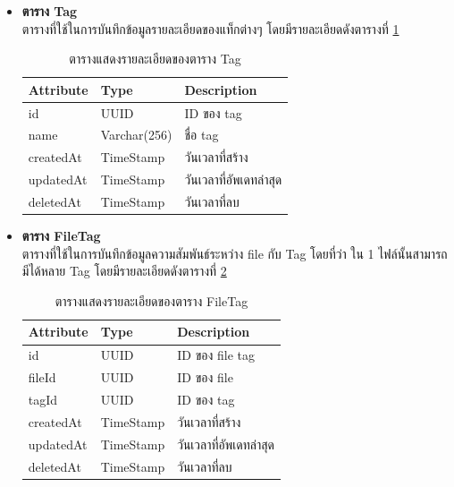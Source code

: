 \documentclass[12pt,oneside,openright,a4paper]{cpe-thai-project}
\begin{document}
\begin{itemize}
\item \textbf{ตาราง Tag}\\
ตารางที่ใช้ในการบันทึกข้อมูลรายละเอียดของแท็กต่างๆ โดยมีรายละเอียดดังตารางที่ \ref{tbl:dbTag}
\begin{table}[!ht]
    \centering
    \begin{tabular}{|p{4cm}|p{2cm}|p{6cm}|}
    \hline
    \textbf{Attribute} & \textbf{Type} & \textbf{Description}   \\ \hline
    id                 & UUID          & ID ของ tag             \\ \hline
    name               & Varchar(256)   & ชื่อ tag               \\ \hline
    createdAt          & TimeStamp     & วันเวลาที่สร้าง        \\ \hline
    updatedAt          & TimeStamp     & วันเวลาที่อัพเดทล่าสุด \\ \hline
    deletedAt          & TimeStamp     & วันเวลาที่ลบ       \\ \hline
    \end{tabular}
    \caption{\centering  ตารางแสดงรายละเอียดของตาราง Tag} \label{tbl:dbTag}
\end{table}

\item \textbf{ตาราง FileTag}\\
ตารางที่ใช้ในการบันทึกข้อมูลความสัมพันธ์ระหว่าง file กับ Tag โดยที่ว่า ใน 1 ไฟล์นั้นสามารถมีได้หลาย Tag โดยมีรายละเอียดดังตารางที่ \ref{tbl:dbFileTag}
\begin{table}[!ht]
    \centering
    \begin{tabular}{|p{4cm}|p{2cm}|p{6cm}|}
    \hline
    \textbf{Attribute} & \textbf{Type} & \textbf{Description}   \\ \hline
    id                 & UUID          & ID ของ file tag        \\ \hline
    fileId             & UUID          & ID ของ file            \\ \hline
    tagId              & UUID          & ID ของ tag             \\ \hline
    createdAt          & TimeStamp     & วันเวลาที่สร้าง        \\ \hline
    updatedAt          & TimeStamp     & วันเวลาที่อัพเดทล่าสุด \\ \hline
    deletedAt          & TimeStamp     & วันเวลาที่ลบ          \\ \hline
    \end{tabular}
    \caption{\centering  ตารางแสดงรายละเอียดของตาราง FileTag} \label{tbl:dbFileTag}
\end{table}


\end{itemize}
\end{document}
